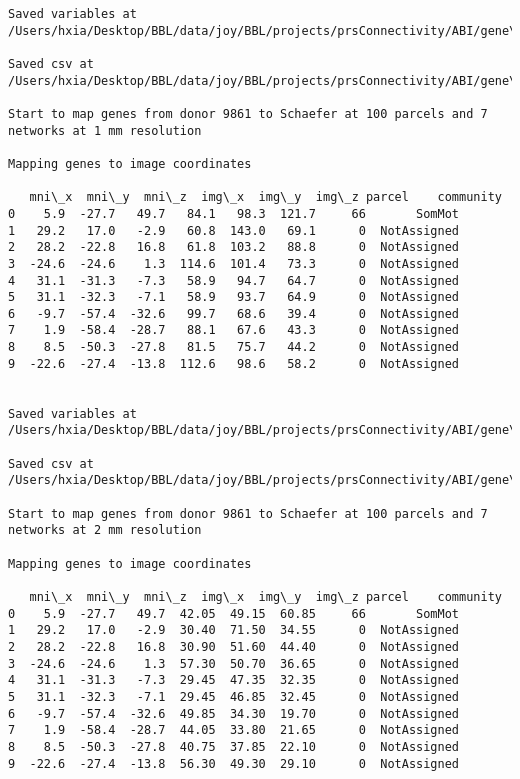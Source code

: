\documentclass[11pt]{article}
\begin{document}
\begin{Verbatim}[commandchars=\\\{\}]
Saved variables at /Users/hxia/Desktop/BBL/data/joy/BBL/projects/prsConnectivity/ABI/gene\_mapping/15697donor\_800Parcels\_17Network\_2mm.pkl

Saved csv at /Users/hxia/Desktop/BBL/data/joy/BBL/projects/prsConnectivity/ABI/gene\_mapping/15697donor\_800Parcels\_17Network\_2mm.csv

Start to map genes from donor 9861 to Schaefer at 100 parcels and 7 networks at 1 mm resolution

Mapping genes to image coordinates

   mni\_x  mni\_y  mni\_z  img\_x  img\_y  img\_z parcel    community
0    5.9  -27.7   49.7   84.1   98.3  121.7     66       SomMot
1   29.2   17.0   -2.9   60.8  143.0   69.1      0  NotAssigned
2   28.2  -22.8   16.8   61.8  103.2   88.8      0  NotAssigned
3  -24.6  -24.6    1.3  114.6  101.4   73.3      0  NotAssigned
4   31.1  -31.3   -7.3   58.9   94.7   64.7      0  NotAssigned
5   31.1  -32.3   -7.1   58.9   93.7   64.9      0  NotAssigned
6   -9.7  -57.4  -32.6   99.7   68.6   39.4      0  NotAssigned
7    1.9  -58.4  -28.7   88.1   67.6   43.3      0  NotAssigned
8    8.5  -50.3  -27.8   81.5   75.7   44.2      0  NotAssigned
9  -22.6  -27.4  -13.8  112.6   98.6   58.2      0  NotAssigned


Saved variables at /Users/hxia/Desktop/BBL/data/joy/BBL/projects/prsConnectivity/ABI/gene\_mapping/9861donor\_100Parcels\_7Network\_1mm.pkl

Saved csv at /Users/hxia/Desktop/BBL/data/joy/BBL/projects/prsConnectivity/ABI/gene\_mapping/9861donor\_100Parcels\_7Network\_1mm.csv

Start to map genes from donor 9861 to Schaefer at 100 parcels and 7 networks at 2 mm resolution

Mapping genes to image coordinates

   mni\_x  mni\_y  mni\_z  img\_x  img\_y  img\_z parcel    community
0    5.9  -27.7   49.7  42.05  49.15  60.85     66       SomMot
1   29.2   17.0   -2.9  30.40  71.50  34.55      0  NotAssigned
2   28.2  -22.8   16.8  30.90  51.60  44.40      0  NotAssigned
3  -24.6  -24.6    1.3  57.30  50.70  36.65      0  NotAssigned
4   31.1  -31.3   -7.3  29.45  47.35  32.35      0  NotAssigned
5   31.1  -32.3   -7.1  29.45  46.85  32.45      0  NotAssigned
6   -9.7  -57.4  -32.6  49.85  34.30  19.70      0  NotAssigned
7    1.9  -58.4  -28.7  44.05  33.80  21.65      0  NotAssigned
8    8.5  -50.3  -27.8  40.75  37.85  22.10      0  NotAssigned
9  -22.6  -27.4  -13.8  56.30  49.30  29.10      0  NotAssigned



\end{Verbatim}
\end{document}
